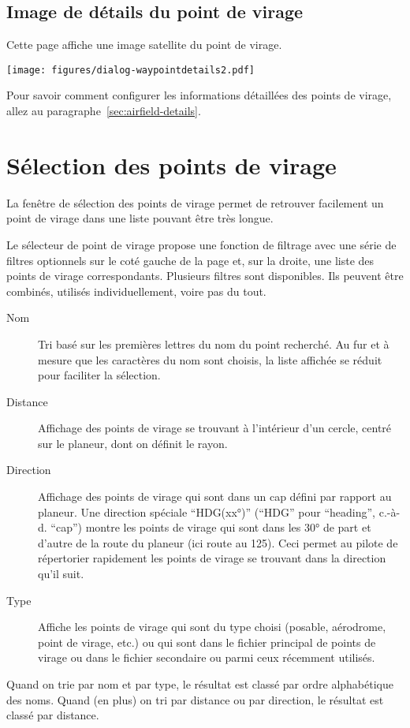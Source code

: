 \subsection*{Image de détails du point de virage}
Cette page affiche une image satellite du point de virage.

\begin{center}
\texttt{[image: figures/dialog-waypointdetails2.pdf]}
\end{center}
Pour savoir comment configurer les informations détaillées des points de virage, allez au paragraphe~\ref{sec:airfield-details}.

\section{Sélection des points de virage}\label{sec:waypoint-selector-dialog}

La fenêtre de sélection des points de virage permet de retrouver facilement
un point de virage dans une liste pouvant être très longue. 

Le sélecteur de point de virage propose une fonction de filtrage avec une série de
filtres optionnels sur le coté gauche de la page et, sur la droite, une liste des points de virage correspondants.
Plusieurs filtres sont disponibles. Ils peuvent être combinés, utilisés individuellement, voire pas du tout.
\begin{description}
\item[Nom] Tri basé sur les premières lettres du nom du point recherché. Au fur et à mesure que les caractères du nom sont choisis, la liste affichée se réduit pour faciliter la sélection.
\item[Distance] Affichage des points de virage se trouvant à l'intérieur d'un cercle, centré sur le planeur, dont on définit le rayon.
\item[Direction] Affichage des points de virage qui sont dans un cap défini par rapport au planeur.
Une direction spéciale ``HDG(xx°)'' (``HDG'' pour ``heading'', c.-à-d. ``cap'')
 montre les points de virage qui sont dans les 30° de part et d'autre de la route du planeur (ici route au 125). Ceci permet au pilote de répertorier rapidement les points de virage se trouvant dans la direction qu'il suit.
\item[Type] Affiche les points de virage qui sont du type choisi (posable, aérodrome, point de virage, etc.)
ou qui sont dans le fichier principal de points de virage ou dans le fichier secondaire
ou parmi ceux récemment utilisés.
\end{description}
Quand on trie par nom et par type, le résultat est classé par ordre alphabétique des noms. Quand (en plus) on tri par distance ou par direction, le résultat est classé par distance.

